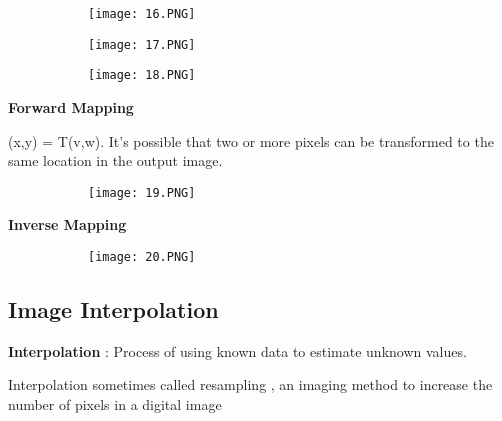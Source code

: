 \documentclass{article}
\begin{document}
\begin{figure}[ht!]
  \centering
  \begin{subfigure}[b]{0.4\linewidth}
    \texttt{[image: 16.PNG]}
  \end{subfigure}
  \begin{subfigure}[b]{0.4\textwidth}
         \centering
         \texttt{[image: 17.PNG]}
     \end{subfigure}
\end{figure}


\begin{figure}[ht!]
  \centering
  \begin{subfigure}[b]{0.4\linewidth}
    \texttt{[image: 18.PNG]}
  \end{subfigure}
\end{figure}


\vspace{70mm}
\textbf{Forward Mapping}
\vspace{3mm}

(x,y) = T{(v,w)}.
It's possible that two or more pixels can be transformed to the same location in the output image.

\begin{figure}[ht!]
  \centering
  \begin{subfigure}[b]{0.4\linewidth}
    \texttt{[image: 19.PNG]}
  \end{subfigure}
\end{figure}

\vspace{30mm}
\textbf{Inverse Mapping}
\vspace{3mm}

\begin{figure}[ht!]
  \centering
  \begin{subfigure}[b]{0.4\linewidth}
    \texttt{[image: 20.PNG]}
  \end{subfigure}
\end{figure}

\vspace{20mm}

\subsection{Image Interpolation}

\textbf{Interpolation} : Process of using known data to estimate unknown values.

Interpolation sometimes called resampling , an imaging method to increase the number of pixels in a digital image
\end{document}
